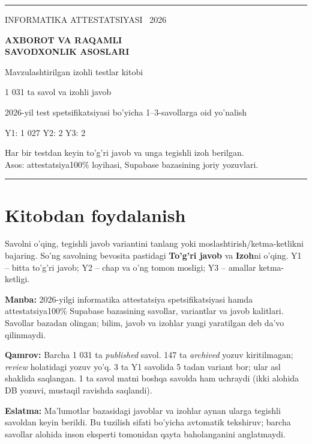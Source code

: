 \documentclass[10pt,a4paper,oneside]{article}
\begin{document}
\begin{titlepage}
\vspace*{26mm}
{\color{teal}\rule{\textwidth}{1.7pt}}\par
\vspace{20mm}
{\Large INFORMATIKA ATTESTATSIYASI \ 2026}\par
\vspace{13mm}
{\fontsize{26}{32}\selectfont\bfseries\color{ink}AXBOROT VA RAQAMLI\\ SAVODXONLIK ASOSLARI}\par
\vspace{10mm}
{\Large Mavzulashtirilgan izohli testlar kitobi}\par
\vspace{17mm}
{\Large 1 031 ta savol va izohli javob}\par
{\normalsize 2026-yil test spetsifikatsiyasi bo'yicha 1--3-savollarga oid yo'nalish}\par
\vspace{17mm}
{\large Y1: 1 027 \quad Y2: 2 \quad Y3: 2}\par
\vfill
{\color{muted}Har bir testdan keyin to'g'ri javob va unga tegishli izoh berilgan.\\
Asos: attestatsiya100\% loyihasi, Supabase bazasining joriy yozuvlari.}\par
\vspace{12mm}
{\color{teal}\rule{\textwidth}{1.7pt}}
\end{titlepage}
\section*{Kitobdan foydalanish}
Savolni o'qing, tegishli javob variantini tanlang yoki moslashtirish/ketma-ketlikni bajaring.
So'ng savolning bevosita pastidagi \textbf{To'g'ri javob} va \textbf{Izoh}ni o'qing.
Y1 -- bitta to'g'ri javob; Y2 -- chap va o'ng tomon mosligi; Y3 -- amallar ketma-ketligi.
\par\textbf{Manba:} 2026-yilgi informatika attestatsiya spetsifikatsiyasi hamda
attestatsiya100\% Supabase bazasining savollar, variantlar va javob kalitlari.
Savollar bazadan olingan; bilim, javob va izohlar yangi yaratilgan deb da'vo qilinmaydi.
\par\textbf{Qamrov:} Barcha 1 031 ta \textit{published} savol. 147 ta \textit{archived} yozuv kiritilmagan;
\textit{review} holatidagi yozuv yo'q. 3 ta Y1 savolida 5 tadan variant bor;
ular asl shaklida saqlangan. 1 ta savol matni boshqa savolda ham uchraydi
(ikki alohida DB yozuvi, mustaqil ravishda saqlandi).
\par\textbf{Eslatma:} Ma'lumotlar bazasidagi javoblar va izohlar aynan ularga tegishli savoldan
keyin berildi. Bu tuzilish sifati bo'yicha avtomatik tekshiruv;
barcha savollar alohida inson eksperti tomonidan qayta baholanganini anglatmaydi.
\tableofcontents
\clearpage
\end{document}

